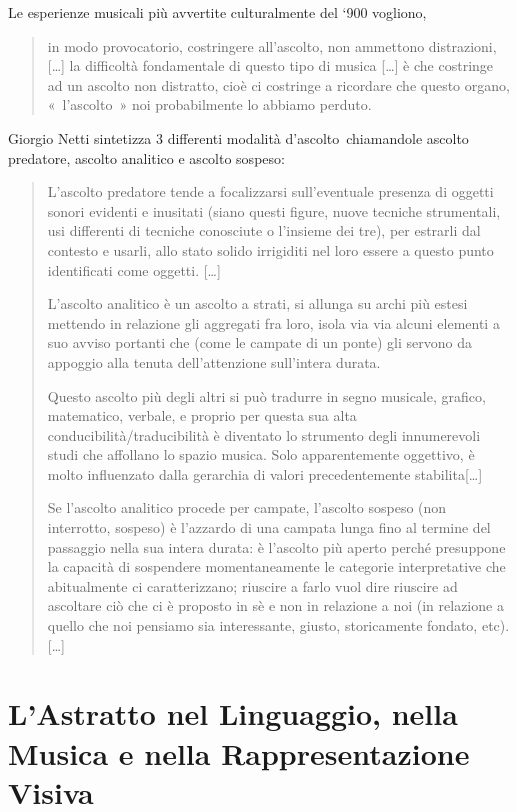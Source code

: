 Le esperienze musicali più avvertite culturalmente  del ‘900 vogliono,

\begin{quote}
in modo provocatorio, costringere all’ascolto, non ammettono distrazioni,
[\ldots] la difficoltà fondamentale di questo tipo di musica [\ldots] è che
costringe ad un ascolto non distratto, cioè ci costringe a ricordare che
questo organo, « l’ascolto » noi probabilmente lo abbiamo perduto.
\end{quote}

Giorgio Netti sintetizza 3 differenti modalità d’ascolto chiamandole ascolto
predatore, ascolto analitico e ascolto sospeso:

\begin{quote}
L’ascolto predatore tende a
focalizzarsi sull’eventuale presenza di oggetti sonori evidenti e inusitati
(siano questi figure, nuove tecniche strumentali, usi differenti di tecniche
conosciute o l’insieme dei tre), per estrarli dal contesto e usarli, allo stato
solido irrigiditi nel loro essere a questo punto identificati come oggetti. [\ldots]

L’ascolto analitico è un ascolto a strati, si allunga su archi più estesi
mettendo in relazione gli aggregati fra loro, isola via via alcuni elementi a
suo avviso portanti che (come le campate di un ponte) gli servono da appoggio
alla tenuta dell’attenzione sull’intera durata.

Questo ascolto più degli altri si può tradurre in segno musicale, grafico,
matematico, verbale, e proprio per questa sua alta conducibilità/traducibilità
è diventato lo strumento degli innumerevoli studi che affollano lo spazio
musica. Solo apparentemente oggettivo, è molto influenzato dalla gerarchia di
valori precedentemente stabilita[\ldots]

Se l’ascolto analitico procede per campate, l’ascolto sospeso (non interrotto,
sospeso) è l’azzardo di una campata lunga fino al termine del passaggio nella
sua intera durata: è l’ascolto più aperto perché presuppone la capacità di
sospendere momentaneamente le categorie interpretative che abitualmente ci
caratterizzano; riuscire a farlo vuol dire riuscire ad ascoltare ciò che ci è
proposto in sè e non in relazione a noi (in relazione a quello che noi pensiamo
sia interessante, giusto, storicamente fondato, etc). [\ldots]
\end{quote}

\section{L’Astratto nel Linguaggio, nella Musica e nella Rappresentazione Visiva}

